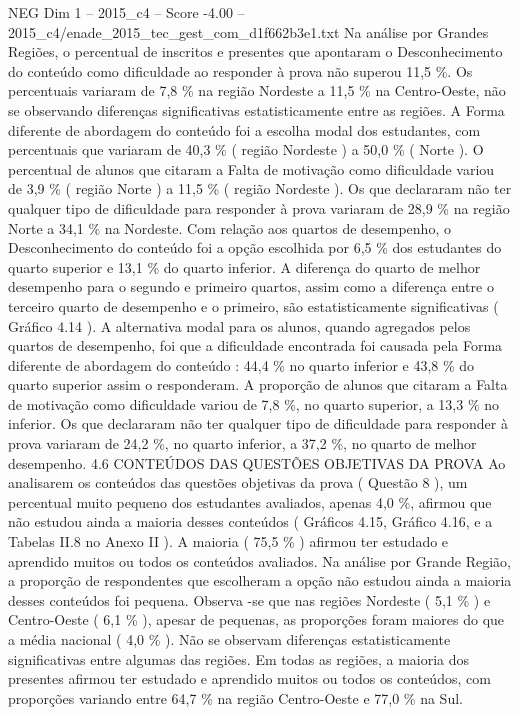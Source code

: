 \begin{textsample}{NEG Dim 1 – 2015\_c4 – Score -4.00 – 2015\_c4/enade\_2015\_tec\_gest\_com\_d1f662b3e1.txt}
Na análise por Grandes Regiões, o percentual de inscritos e presentes que apontaram o Desconhecimento do conteúdo como dificuldade ao responder à prova não superou 11,5 \%.
Os percentuais variaram de 7,8 \% na região Nordeste a 11,5 \% na Centro-Oeste, não se observando diferenças significativas estatisticamente entre as regiões.
A Forma diferente de abordagem do conteúdo foi a escolha modal dos estudantes, com percentuais que variaram de 40,3 \% ( região Nordeste ) a 50,0 \% ( Norte ).
O percentual de alunos que citaram a Falta de motivação como dificuldade variou de 3,9 \% ( região Norte ) a 11,5 \% ( região Nordeste ).
Os que declararam não ter qualquer tipo de dificuldade para responder à prova variaram de 28,9 \% na região Norte a 34,1 \% na Nordeste.
Com relação aos quartos de desempenho, o Desconhecimento do conteúdo foi a opção escolhida por 6,5 \% dos estudantes do quarto superior e 13,1 \% do quarto inferior.
A diferença do quarto de melhor desempenho para o segundo e primeiro quartos, assim como a diferença entre o terceiro quarto de desempenho e o primeiro, são estatisticamente significativas ( Gráfico 4.14 ).
A alternativa modal para os alunos, quando agregados pelos quartos de desempenho, foi que a dificuldade encontrada foi causada pela Forma diferente de abordagem do conteúdo : 44,4 \% no quarto inferior e 43,8 \% do quarto superior assim o responderam.
A proporção de alunos que citaram a Falta de motivação como dificuldade variou de 7,8 \%, no quarto superior, a 13,3 \% no inferior.
Os que declararam não ter qualquer tipo de dificuldade para responder à prova variaram de 24,2 \%, no quarto inferior, a 37,2 \%, no quarto de melhor desempenho. 4.6 CONTEÚDOS DAS QUESTÕES OBJETIVAS DA PROVA Ao analisarem os conteúdos das questões objetivas da prova ( Questão 8 ), um percentual muito pequeno dos estudantes avaliados, apenas 4,0 \%, afirmou que não estudou ainda a maioria desses conteúdos ( Gráficos 4.15, Gráfico 4.16, e a Tabelas II.8 no Anexo II ).
A maioria ( 75,5 \% ) afirmou ter estudado e aprendido muitos ou todos os conteúdos avaliados.
Na análise por Grande Região, a proporção de respondentes que escolheram a opção não estudou ainda a maioria desses conteúdos foi pequena.
Observa -se que nas regiões Nordeste ( 5,1 \% ) e Centro-Oeste ( 6,1 \% ), apesar de pequenas, as proporções foram maiores do que a média nacional ( 4,0 \% ).
Não se observam diferenças estatisticamente significativas entre algumas das regiões.
Em todas as regiões, a maioria dos presentes afirmou ter estudado e aprendido muitos ou todos os conteúdos, com proporções variando entre 64,7 \% na região Centro-Oeste e 77,0 \% na Sul.

\end{textsample}
